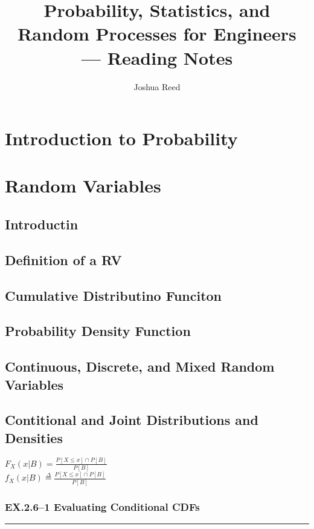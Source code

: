\documentclass[a4paper]{article}
\title{Probability, Statistics, and Random Processes for Engineers --- Reading Notes}
\author{Joshua Reed}
\begin{document}
\maketitle

\section{Introduction to Probability}\label{sec:introduction_to_probability}
\section{Random Variables}\label{sec:random_variables}
\subsection{Introductin}\label{sub:introductin}
\subsection{Definition of a RV}\label{sub:introductin_label_sub_introductin}
\subsection{Cumulative Distributino Funciton}\label{sub:cumulative_distributino_funciton}
\subsection{Probability Density Function}\label{sub:probability_density_function}
\subsection{Continuous, Discrete, and Mixed Random Variables}\label{sub:continuous_discrete_and_mixed_random_variables}
\subsection{Contitional and Joint Distributions and Densities}\label{sub:contitional_and_joint_distributions_and_densities}
$F_X(x|B)=\frac{P[X\leq x]\cap P[B]}{P[B]}$\\
$f_X(x|B)\stackrel{\Delta}{=}\frac{P[X\leq x]\cap P[B]}{P[B]}$
\subsubsection{EX.\@ 2.6--1 Evaluating Conditional CDFs}\label{ssub:evaluating_conditional_cdfs}
\hrule\vspace{2mm}
\end{document}

